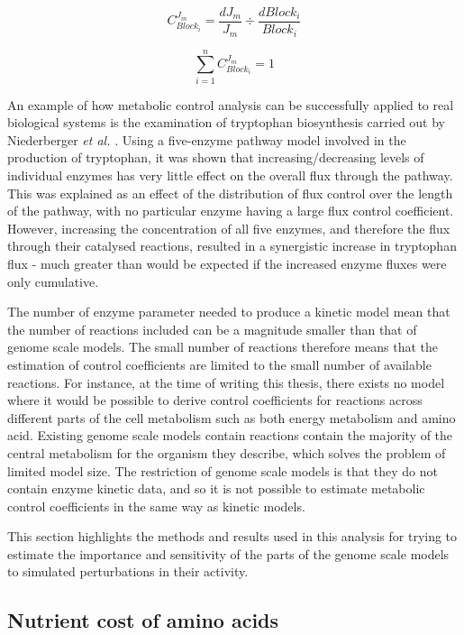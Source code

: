 \begin{equation}\label{fcc}
C_{Block_i}^{J_m} = \frac{dJ_m}{J_m}\div\frac{dBlock_i}{Block_i}
\end{equation}

\begin{equation}\label{summation_theorum}
\sum_{i=1}^{n}C_{Block_i}^{J_m} = 1
\end{equation}

An example of how metabolic control analysis can be successfully applied to real biological systems is the examination of tryptophan biosynthesis carried out by Niederberger \emph{et al.} \cite{niederberger1992}. Using a five-enzyme pathway model involved in the production of tryptophan, it was shown that increasing/decreasing levels of individual enzymes has very little effect on the overall flux through the pathway. This was explained as an effect of the distribution of flux control over the length of the pathway, with no particular enzyme having a large flux control coefficient. However, increasing the concentration of all five enzymes, and therefore the flux through their catalysed reactions, resulted in a synergistic increase in tryptophan flux - much greater than would be expected if the increased enzyme fluxes were only cumulative.

The number of enzyme parameter needed to produce a kinetic model mean that the number of reactions included can be a magnitude smaller than that of genome scale models. The small number of reactions therefore means that the estimation of  control coefficients are limited to the small number of available reactions. For instance, at the time of writing this thesis, there exists no model where it would be possible to derive control coefficients for reactions across different parts of the cell metabolism such as both energy metabolism and amino acid. Existing genome scale models contain reactions contain the majority of the central metabolism for the organism they describe, which solves the problem of limited model size. The restriction of genome scale models is that they do not contain enzyme kinetic data, and so it is not possible to estimate metabolic control coefficients in the same way as kinetic models.

This section highlights the methods and results used in this analysis for trying to estimate the importance and sensitivity of the parts of the genome scale models to simulated perturbations in their activity.

\subsection{Nutrient cost of amino acids}

